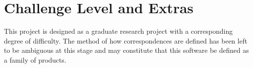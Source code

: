 \documentclass{article}
\begin{document}
\section{Challenge Level and Extras}
This project is designed as a graduate research project with a corresponding 
degree of difficulty. The method of how correspondences are defined has been 
left to be ambiguous at this stage and may constitute that this software be 
defined as a family of products.
\newline
\newline
\end{document}

